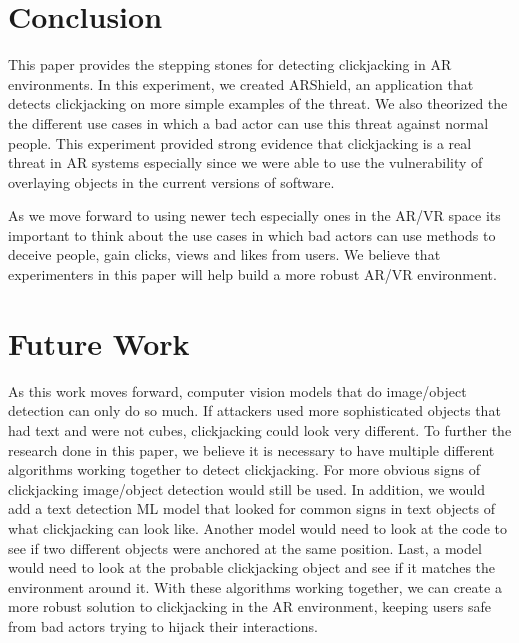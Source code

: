 \documentclass[conference]{IEEEtran}
\begin{document}
\section{Conclusion}

This paper provides the stepping stones for detecting clickjacking in AR environments. In this experiment, we created ARShield, an application that detects clickjacking on more simple examples of the threat. We also theorized the the different use cases in which a bad actor can use this threat against normal people. This experiment provided strong evidence that clickjacking is a real threat in AR systems especially since we were able to use the vulnerability of overlaying objects in the current versions of software. 

As we move forward to using newer tech especially ones in the AR/VR space its important to think about the use cases in which bad actors can use methods to deceive people, gain clicks, views and likes from users. We believe that experimenters in this paper will help build a more robust AR/VR environment.

\section{Future Work}

As this work moves forward, computer vision models that do image/object detection can only do so much. If attackers used more sophisticated objects that had text and were not cubes, clickjacking could look very different. To further the research done in this paper, we believe it is necessary to have multiple different algorithms working together to detect clickjacking. For more obvious signs of clickjacking image/object detection would still be used. In addition, we would add a text detection ML model that looked for common signs in text objects of what clickjacking can look like. Another model would need to look at the code to see if two different objects were anchored at the same position. Last, a model would need to look at the probable clickjacking object and see if it matches the environment around it. With these algorithms working together, we can create a more robust solution to clickjacking in the AR environment, keeping users safe from bad actors trying to hijack their interactions. 






\end{document}
